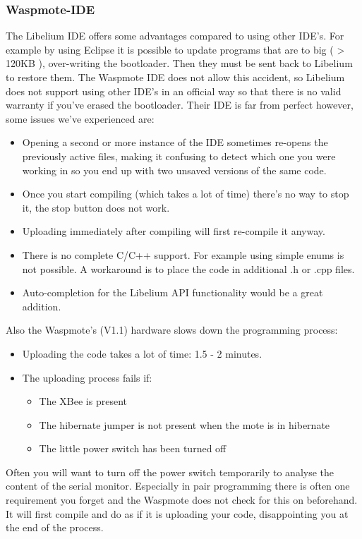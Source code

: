 \subsubsection{Waspmote-IDE}
The Libelium IDE offers some advantages compared to using other IDE's. For example by using Eclipse it is possible to update programs that are to big ( > 120KB ), over-writing the bootloader. Then they must be sent back to Libelium to restore them. The Waspmote IDE does not allow this accident, so Libelium does not support using other IDE's in an official way so that there is no valid warranty if you've erased the bootloader. Their IDE is far from perfect however, some issues we've experienced are:\\
\begin{itemize}
\item Opening a second or more instance of the IDE sometimes re-opens the previously active files, making it confusing to detect which one you were working in so you end up with two unsaved versions of the same code.
\item Once you start compiling (which takes a lot of time) there's no way to stop it, the stop button does not work.
\item Uploading immediately after compiling will first re-compile it anyway.
\item There is no complete C/C++ support. For example using simple enums is not possible. A workaround is to place the code in additional .h or .cpp files.
\item Auto-completion for the Libelium API functionality would be a great addition.
\end{itemize}
\bigskip
Also the Waspmote's (V1.1) hardware slows down the programming process:
\begin{itemize}
\item Uploading the code takes a lot of time: 1.5 - 2 minutes.
\item The uploading process fails if:
\begin{itemize}
\item The XBee is present
\item The hibernate jumper is not present when the mote is in hibernate
\item The little power switch has been turned off
\end{itemize}
\end{itemize}
Often you will want to turn off the power switch temporarily to analyse the content of the serial monitor. Especially in pair programming there is often one requirement you forget and the Waspmote does not check for this on beforehand. It will first compile and do as if it is uploading your code, disappointing you at the end of the process.\\
